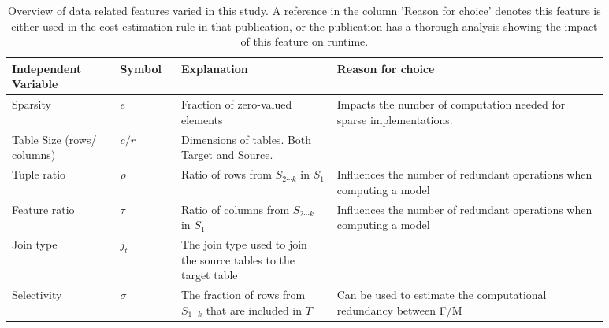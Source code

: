\begingroup
\renewcommand{\arraystretch}{1.5}
\begin{table}[t]
  \centering
  \begin{tabular}{p{0.16\linewidth}p{0.09\linewidth}p{0.23\linewidth}p{0.4\linewidth}}
    \toprule
    Independent Variable       & Symbol   & Explanation                                                        & Reason for choice                                                                                               \\ \midrule \midrule
    Sparsity                   & $e$      & Fraction of zero-valued elements                                   & Impacts the number of computation needed for sparse implementations.~\cite{MorpheusFI, morpheus, amalur_tkde24} \\
    Table Size (rows/ columns) & $c/r$    & Dimensions of tables. Both Target and Source.                      & ~\cite{morpheus, amalur_tkde24}                                                                                 \\
    Tuple ratio                & $\rho$   & Ratio of rows from $S_{2\cdots k}$ in $S_1$                        & Influences the number of redundant operations when computing a model~\cite{morpheus, amalur_tkde24}             \\
    Feature ratio              & $\tau$   & Ratio of columns from $S_{2\cdots k}$ in $S_1$                     & Influences the number of redundant operations when computing a model~\cite{morpheus, amalur_tkde24}             \\
    Join type                  & $j_t$    & The join type used to join the source tables to the target table   & ~\cite{amalur_tkde24}                                                                                           \\
    Selectivity                & $\sigma$ & The fraction of rows from $S_{1\cdots k}$ that are included in $T$ & Can be used to estimate the computational redundancy between F/M~\cite{MorpheusFI, amalur_tkde24}               \\
    \bottomrule
  \end{tabular}
  \caption[Overview of data related features varied in this study]{Overview of data related features varied in this study. A reference in the column 'Reason for choice' denotes this feature is either used in the cost estimation rule in that publication, or the publication has a thorough analysis showing the impact of this feature on runtime.}
  \label{tab:4-data_chars}
\end{table}
\endgroup

